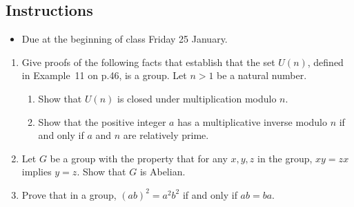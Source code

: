 \documentclass[11pt]{article}
\begin{document}
\subsection*{Instructions}
\begin{itemize}
\item Due at the beginning of class Friday 25 January.
\end{itemize}

\begin{enumerate}
\item Give proofs of the following facts that establish that the
  set $U(n)$, defined in Example~11 on p.46, is a group. Let $n>1$ be a
  natural number.
  \begin{enumerate}
  \item Show that $U(n)$ is closed under multiplication modulo $n$.
\item Show that the positive integer $a$ has a multiplicative inverse
  modulo $n$ if and only if $a$ and $n$ are relatively prime.
  \end{enumerate}
\item Let $G$ be a group with the property that for any $x,y,z$ in the
  group, $xy=zx$ implies $y=z$. Show that $G$ is Abelian.
\item Prove that in a group, $(ab)^2 = a^2b^2$ if and only if $ab=ba$.
\end{enumerate}
\end{document}
